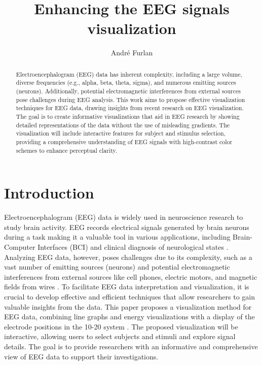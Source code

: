 \documentclass[format=sigconf]{acmart}
\title{Enhancing the EEG signals visualization}
\author{André Furlan}
\affiliation{
	\institution{UNESP - Universidade Estadual Paulista Júlio de Mesquita Filho}
	\city{São José do Rio Preto}
	\state{André Furlan}
	\country{Brazil}
}
\begin{document}
	
	\begin{abstract}
		Electroencephalogram (EEG) data has inherent complexity, including a large volume, diverse frequencies (e.g., alpha, beta, theta, sigma), and numerous emitting sources (neurons). Additionally, potential electromagnetic interferences from external sources pose challenges during EEG analysis. This work aims to propose effective visualization techniques for EEG data, drawing insights from recent research on EEG visualization. The goal is to create informative visualizations that aid in EEG research by showing detailed representations of the data without the use of misleading gradients. The visualization will include interactive features for subject and stimulus selection, providing a comprehensive understanding of EEG signals with high-contrast color schemes to enhance perceptual clarity.
	\end{abstract}
	
	\maketitle
	
	\section{Introduction}
		\par Electroencephalogram (EEG) data is widely used in neuroscience research to study brain activity. EEG records electrical signals generated by brain neurons during a task making it a valuable tool in various applications, including Brain-Computer Interfaces (BCI) and clinical diagnosis of neurological states \cite{8937083}. Analyzing EEG data, however, poses challenges due to its complexity, such as a vast number of emitting sources (neurons) and potential electromagnetic interferences from external sources like cell phones, electric motors, and magnetic fields from wires \cite{8937083}. To facilitate EEG data interpretation and visualization, it is crucial to develop effective and efficient techniques that allow researchers to gain valuable insights from the data. This paper proposes a visualization method for EEG data, combining line graphs and energy visualizations with a display of the electrode positions in the 10-20 system \cite{sistema10-20}. The proposed visualization will be interactive, allowing users to select subjects and stimuli and explore signal details. The goal is to provide researchers with an informative and comprehensive view of EEG data to support their investigations.
	
\end{document}
